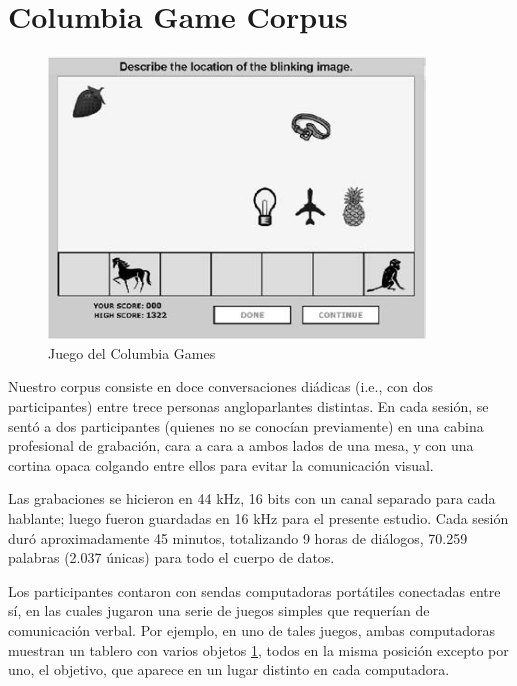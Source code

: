 \section{Columbia Game Corpus}

\begin{figure}
\centering
\includegraphics[width=10cm]{images/columbia_games.jpg}
\caption{Juego del Columbia Games}
\label{tablero_columbia_games}
\end{figure}

\newcommand{\cardgame} {\emph{Juego de cartas}}
\newcommand{\objectgame} {\emph{Juego de objetos}}


Nuestro corpus \cite{GRAV2009} consiste en doce conversaciones diádicas (i.e., con dos participantes) entre trece personas angloparlantes distintas. En cada sesión, se sentó a dos participantes (quienes no se conocían previamente) en una cabina profesional de grabación, cara a cara a ambos lados de una mesa, y con una cortina opaca colgando entre ellos para evitar la comunicación visual.


Las grabaciones se hicieron en 44 kHz, 16 bits con un canal separado para cada hablante; luego fueron guardadas en 16 kHz para el presente estudio. Cada sesión duró aproximadamente 45 minutos, totalizando 9 horas de diálogos, 70.259 palabras (2.037 únicas) para todo el cuerpo de datos.


Los participantes contaron con sendas computadoras portátiles conectadas entre sí, en las cuales jugaron una serie de juegos simples que requerían de comunicación verbal. Por ejemplo, en uno de tales juegos, ambas computadoras muestran un tablero con varios objetos \ref{tablero_columbia_games}, todos en la misma posición excepto por uno, el objetivo, que aparece en un lugar distinto en cada computadora.

